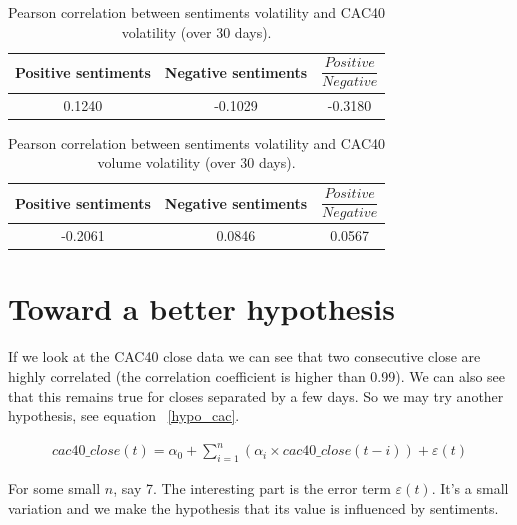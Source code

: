 \documentclass[12pt]{report}
\begin{document}
			\begin{table}
			\begin{center}
			\begin{tabular}{|c | c | c|}
				\hline
				Positive sentiments & Negative sentiments & $\dfrac{Positive}{Negative}$\\
				\hline
				0.1240 & -0.1029 & -0.3180\\
				\hline
			\end{tabular}
			\end{center}
			
			\caption{Pearson correlation between sentiments volatility and CAC40 volatility (over 30 days).\label{pearson_vol_cac}}
			\end{table}

			\begin{table}
			\begin{center}
			\begin{tabular}{|c | c | c|}
				\hline
				Positive sentiments & Negative sentiments & $\dfrac{Positive}{Negative}$\\
				\hline
				-0.2061 & 0.0846 & 0.0567\\
				\hline
			\end{tabular}
			\end{center}
			
			\caption{Pearson correlation between sentiments volatility and CAC40 volume volatility (over 30 days).\label{pearson_vol_vol}}
			\end{table}

		\section{Toward a better hypothesis}

		If we look at the CAC40 close data we can see that two consecutive close are highly correlated (the correlation coefficient is higher than 0.99). We can also see that this remains true for closes separated by a few days. So we may try another hypothesis, see equation ~\ref{hypo_cac}.

			\begin{eqnarray}
				cac40\_close(t) = \alpha_0 + \sum_{i = 1}^{n}\left(\alpha_i\times{}cac40\_close(t - i)\right) + \varepsilon(t)\label{hypo_cac}
			\end{eqnarray}

			For some small $n$, say 7. The interesting part is the error term $\varepsilon(t)$. It's a small variation and we make the hypothesis that its value is influenced by sentiments.
\end{document}
